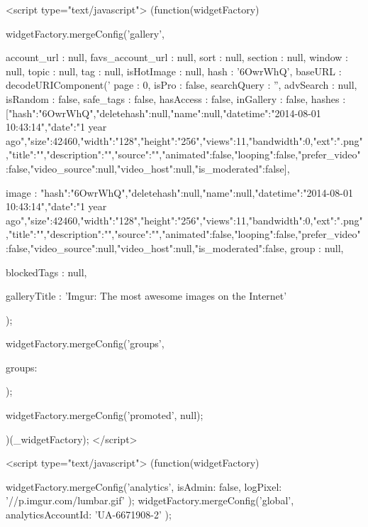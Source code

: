 {{        <script type="text/javascript">
    (function(widgetFactory) {
        widgetFactory.mergeConfig('gallery', {
            account_url         : null,
            favs_account_url    : null,
            sort                : null,
            section             : null,
            window              : null,
            topic               : null,
            tag                 : null,
            isHotImage          : null,
            hash                : '6OwrWhQ',
            baseURL             : decodeURIComponent('%
            page                : 0,
            isPro               : false,
            searchQuery         : '',
            advSearch           : null,
            isRandom            : false,
            safe_tags           : false,
            hasAccess           : false,
            inGallery           : false,
            hashes              : [{"hash":"6OwrWhQ","deletehash":null,"name":null,"datetime":"2014-08-01 10:43:14","date":"1 year ago","size":42460,"width":"128","height":"256","views":11,"bandwidth":0,"ext":".png","title":"","description":"","source":"","animated":false,"looping":false,"prefer_video":false,"video_source":null,"video_host":null,"is_moderated":false}],
        
            image               : {"hash":"6OwrWhQ","deletehash":null,"name":null,"datetime":"2014-08-01 10:43:14","date":"1 year ago","size":42460,"width":"128","height":"256","views":11,"bandwidth":0,"ext":".png","title":"","description":"","source":"","animated":false,"looping":false,"prefer_video":false,"video_source":null,"video_host":null,"is_moderated":false},
            group               : null,
        
            blockedTags         : null,
        
        
            galleryTitle        : 'Imgur: The most awesome images on the Internet'
        });

        widgetFactory.mergeConfig('groups', {
            groups: {
                
            }
        });

        widgetFactory.mergeConfig('promoted', null);
    })(_widgetFactory);
    </script>

            <script type="text/javascript">
            (function(widgetFactory) {
                widgetFactory.mergeConfig('analytics', {
                    isAdmin: false,
                    logPixel: '//p.imgur.com/lumbar.gif'
                });
                widgetFactory.mergeConfig('global', {
                    analyticsAccountId: 'UA-6671908-2'
                });

}}}
